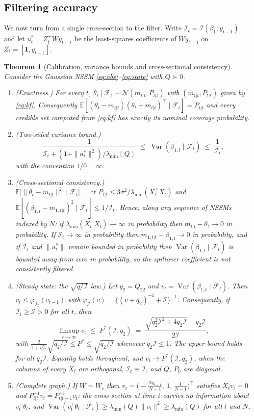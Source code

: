 \documentclass[12pt]{article}
\theoremstyle{plain}
\newtheorem{theorem}{Theorem}
\theoremstyle{definition}
\theoremstyle{remark}
\newcommand{\E}{\mathbb{E}}
\newcommand{\Var}{\operatorname{Var}}
\newcommand{\tr}{\operatorname{tr}}
\newcommand{\one}{\mathbf{1}}
\newcommand{\calF}{\mathcal{F}}
\newcommand{\calI}{\mathcal{I}}
\newcommand{\calN}{\mathcal{N}}
\newcommand{\Wc}{W_{\mathrm{c}}}
\newcommand{\T}{^{\top}}
\begin{document}
\subsection{Filtering accuracy}\label{sec:filter}

We now turn from a single cross-section to the filter. Write $\calI_t=\calI(\beta_1;y_{t-1})$ and let $u_t^*=Z_t^{+}Wy_{t-1}$ be the least-squares coefficients of $Wy_{t-1}$ on $Z_t=[\one,y_{t-1}]$.

\begin{theorem}[Calibration, variance bounds and cross-sectional consistency]\label{thm:filter}
Consider the Gaussian NSSM \eqref{eq:obs}--\eqref{eq:state} with $Q\succ0$.
\begin{enumerate}[label=(\roman*),leftmargin=*]
\item \textup{(Exactness.)} For every $t$, $\theta_t\mid\calF_t\sim\calN(m_{t|t},P_{t|t})$ with $(m_{t|t},P_{t|t})$ given by \eqref{eq:kf}. Consequently $\E[(\theta_t-m_{t|t})(\theta_t-m_{t|t})\T\mid\calF_t]=P_{t|t}$ and every credible set computed from \eqref{eq:kf} has exactly its nominal coverage probability.
\item \textup{(Two-sided variance bound.)}
\[
\frac{1}{\calI_t+(1+\|u_t^*\|^2)/\lambda_{\min}(Q)}\;\le\;\Var(\beta_{1,t}\mid\calF_t)\;\le\;\frac{1}{\calI_t},
\]
with the convention $1/0=\infty$.
\item \textup{(Cross-sectional consistency.)} $\E\big[\|\theta_t-m_{t|t}\|^2\mid\calF_t\big]=\tr P_{t|t}\le 3\sigma^2/\lambda_{\min}(X_t\T X_t)$ and $\E[(\beta_{1,t}-m_{1,t|t})^2\mid\calF_t]\le1/\calI_t$. Hence, along any sequence of NSSMs indexed by $N$: if $\lambda_{\min}(X_t\T X_t)\to\infty$ in probability then $m_{t|t}-\theta_t\to0$ in probability. If $\calI_t\to\infty$ in probability then $m_{1,t|t}-\beta_{1,t}\to0$ in probability, and if $\calI_t$ and $\|u_t^*\|$ remain bounded in probability then $\Var(\beta_{1,t}\mid\calF_t)$ is bounded away from zero in probability, so the spillover coefficient is not consistently filtered.
\item \textup{(Steady state: the $\sqrt{q/\calI}$ law.)} Let $q_2=Q_{22}$ and $v_t=\Var(\beta_{1,t}\mid\calF_t)$. Then $v_t\le\varphi_{\calI_t}(v_{t-1})$ with $\varphi_{\calI}(v)=\{(v+q_2)^{-1}+\calI\}^{-1}$. Consequently, if $\calI_t\ge\calI>0$ for all $t$, then
\[
\limsup_{t\to\infty}v_t\;\le\;P^\ast(\calI,q_2)\;=\;\frac{\sqrt{q_2^2\calI^2+4q_2\calI}-q_2\calI}{2\calI},
\]
with $\tfrac{2}{1+\sqrt5}\sqrt{q_2/\calI}\le P^\ast\le\sqrt{q_2/\calI}$ whenever $q_2\calI\le1$. The upper bound holds for all $q_2\calI$. Equality holds throughout, and $v_t\to P^\ast(\calI,q_2)$, when the columns of every $X_t$ are orthogonal, $\calI_t\equiv\calI$, and $Q$, $P_0$ are diagonal.
\item \textup{(Complete graph.)} If $W=\Wc$ then $v_t=\big(-\tfrac{N\bar y_{t-1}}{N-1},\,1,\,\tfrac{1}{N-1}\big)\T$ satisfies $X_tv_t=0$ and $P_{t|t}^{-1}v_t=P_{t|t-1}^{-1}v_t$: the cross-section at time $t$ carries no information about $v_t\T\theta_t$, and $\Var(v_t\T\theta_t\mid\calF_t)\ge\lambda_{\min}(Q)\|v_t\|^2\ge\lambda_{\min}(Q)$ for all $t$ and $N$.
\end{enumerate}
\end{theorem}
\end{document}
